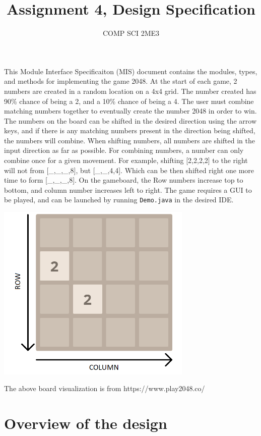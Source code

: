 \documentclass[12pt]{article}
\title{Assignment 4, Design Specification}
\author{COMP SCI 2ME3}
\begin{document}
\maketitle

This Module Interface Specificaiton (MIS) document contains the modules,
types, and methods for implementing the game 2048. At the start of each
game, 2 numbers are created in a random location on a 4x4 grid. The number
created has 90\% chance of being a 2, and a 10\% chance of being a 4. The
user must combine matching numbers together to eventually create the number
2048 in order to win. The numbers on the board can be shifted in the
desired direction using the arrow keys, and if there is any matching
numbers present in the direction being shifted, the numbers will combine.
When shifting numbers, all numbers are shifted in the input direction as
far as possible. For combining numbers, a number can only combine once for
a given movement. For example, shifting [2,2,2,2] to the right will not
from [\_,\_,\_,8], but [\_,\_,4,4]. Which can be then shifted right one
more time to form [\_,\_,\_,8]. On the gameboard, the Row numbers increase
top to bottom, and column number increases left to right. The game requires
a GUI to be played, and can be launched by running \texttt{Demo.java} in
the desired IDE.

\begin{center}
  \includegraphics[width=0.7\textwidth]{naming.png}

  The above board visualization is from https://www.play2048.co/
\end{center}

\newpage

\section{Overview of the design}
\end{document}
